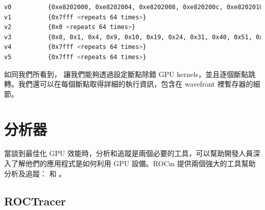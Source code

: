 \begin{lstlisting}[language=bash, caption={info registers 命令的部分輸出結果}, label={lst:Partial output of info registers command}]
v0          {0xe8202000, 0xe8202004, 0xe8202008, 0xe820200c, 0xe8202010, 0xe8202014, 0xe8202018, 0xe820201c, 0xe8202020, 0xe8202024, 0xe8202028, 0xe820202c, 0xe8202030, 0xe8202034, 0xe8202038, 0xe820203c, 0xe8202040, 0xe8202044, 0xe8202048, 0xe820204c, 0xe8202050, 0xe8202054, 0xe8202058, 0xe820205c, 0xe8202060, 0xe8202064, 0xe8202068, 0xe820206c, 0xe8202070, 0xe8202074, 0xe8202078, 0xe820207c, 0xe8202080, 0xe8202084, 0xe8202088, 0xe820208c, 0xe8202090, 0xe8202094, 0xe8202098, 0xe820209c, 0xe82020a0, 0xe82020a4, 0xe82020a8, 0xe82020ac, 0xe82020b0, 0xe82020b4, 0xe82020b8, 0xe82020bc, 0xe82020c0, 0xe82020c4, 0xe82020c8, 0xe82020cc, 0xe82020d0, 0xe82020d4, 0xe82020d8, 0xe82020dc, 0xe82020e0, 0xe82020e4, 0xe82020e8, 0xe82020ec, 0xe82020f0, 0xe82020f4, 0xe82020f8, 0xe82020fc}
v1          {0x7fff <repeats 64 times>}
v2          {0x0 <repeats 64 times>}
v3          {0x0, 0x1, 0x4, 0x9, 0x10, 0x19, 0x24, 0x31, 0x40, 0x51, 0x64, 0x79, 0x90, 0xa9, 0xc4, 0xe1, 0x100, 0x121, 0x144, 0x169, 0x190, 0x1b9, 0x1e4, 0x211, 0x240, 0x271, 0x2a4, 0x2d9, 0x310, 0x349, 0x384, 0x3c1, 0x400, 0x441, 0x484, 0x4c9, 0x510, 0x559, 0x5a4, 0x5f1, 0x640, 0x691, 0x6e4, 0x739, 0x790, 0x7e9, 0x844, 0x8a1, 0x900, 0x961, 0x9c4, 0xa29, 0xa90, 0xaf9, 0xb64, 0xbd1, 0xc40, 0xcb1, 0xd24, 0xd99, 0xe10, 0xe89, 0xf04, 0xf81}
v4          {0x7fff <repeats 64 times>}
v5          {0x7fff <repeats 64 times>}
\end{lstlisting}

如同我們所看到， 讓我們能夠透過設定斷點除錯 GPU kernels，並且逐個斷點跳轉。我們還可以在每個斷點取得詳細的執行資訊，包含在 wavefront 裡暫存器的細節。

\section{ 分析器}

當談到最佳化 GPU 效能時，分析和追蹤是兩個必要的工具，可以幫助開發人員深入了解他們的應用程式是如何利用 GPU 設備。ROCm 提供兩個強大的工具幫助分析及追蹤： 和 。

\subsection{ROCTracer}


